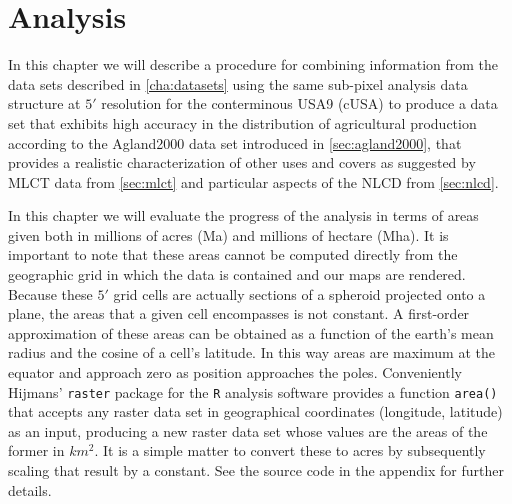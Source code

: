 










\graphicspath{ {analysis/} }

\chapter{Analysis}
\label{cha:analysis}




In this chapter we will describe a procedure for combining information
from the data sets described in \autoref{cha:datasets} using the same
sub-pixel analysis data structure at $5'$ resolution for the
conterminous USA9 (cUSA) to produce a data set that exhibits high
accuracy in the distribution of agricultural production according to
the Agland2000 data set introduced in \autoref{sec:agland2000}, that
provides a realistic characterization of other uses and covers as
suggested by MLCT data from \autoref{sec:mlct} and particular aspects
of the NLCD from \autoref{sec:nlcd}.

In this chapter we will evaluate the progress of the analysis in terms
of areas given both in millions of acres (Ma) and millions of hectare
(Mha).  It is important to note that these areas cannot be computed
directly from the geographic grid in which the data is contained and
our maps are rendered.  Because these $5'$ grid cells are actually
sections of a spheroid projected onto a plane, the areas that a given
cell encompasses is not constant.  A first-order approximation of
these areas can be obtained as a function of the earth's mean radius
and the cosine of a cell's latitude.  In this way areas are maximum at
the equator and approach zero as position approaches the poles.
Conveniently Hijmans' \texttt{raster} package for the \texttt{R}
analysis software provides a function \texttt{area()} that accepts any
raster data set in geographical coordinates (longitude, latitude) as
an input, producing a new raster data set whose values are the areas
of the former in $km^2$.  It is a simple matter to convert these to
acres by subsequently scaling that result by a constant.  See the
source code in the appendix for further details.

